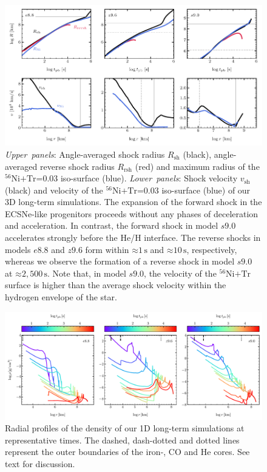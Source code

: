 \documentclass[fleqn,usenatbib]{mnras}
\newcommand{\nickel}{\ensuremath{\mathrm{^{56}Ni}}\xspace}
\newcommand{\tracer}{\ensuremath{\mathrm{Tr}}\xspace}
\newcommand{\s}{\ensuremath{\text{s}}}
\begin{document}
\begin{figure}
 \centering
 \includegraphics[width=\textwidth]{pic/radii_velocity_shock_nickel_paper.pdf}
 \caption{   
  \textit{Upper~panels}: Angle-averaged shock radius $R_{\mathrm{sh}}$ (black),
 angle-averaged reverse shock radius $R_{\mathrm{rsh}}$ (red) and maximum radius of the 
 $\nickel\mathord{+}\tracer\mathord{=}0.03$ iso-surface (blue). 
 \textit{Lower~panels}:
 Shock velocity $v_{\mathrm{sh}}$ (black) and velocity of the 
 $\nickel\mathord{+}\tracer\mathord{=}0.03$ iso-surface (blue) 
 of our 3D long-term simulations. 
 The expansion of the forward shock in the ECSNe-like progenitors proceeds without
 any phases of deceleration and acceleration. 
 In contrast, the forward shock in model $s9.0$ accelerates strongly before the He/H interface.
 The reverse shocks in models $e8.8$ and $z9.6$ form within $\mathord{\approx}1\,\s$ and 
 $\mathord{\approx}10\,\s$, respectively, 
 whereas we observe the formation of a reverse shock in model $s9.0$ at
 $\mathord{\approx} 2,500\,\s$.
 Note that, in model $s9.0$, the velocity of the $\nickel \mathord{+} \tracer$ 
 surface is higher than the average shock velocity within the hydrogen envelope of the star.
 }
 \label{fig:radii all times}
\end{figure}

\begin{figure}
 \centering
 \includegraphics[width=\textwidth, trim=0cm 0.0cm 0cm 0.0cm,clip]{pic/density_profiles_1d_long_term.pdf}
 \caption{Radial profiles of the density of our 1D long-term simulations at representative times. The dashed, dash-dotted and dotted lines represent the outer boundaries of the iron-, CO and He cores. See text for discussion.}
 \label{fig:density profiles all times}
\end{figure}
\end{document}
